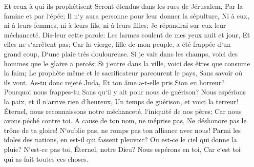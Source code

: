 \verse Et ceux à qui ils prophétisent Seront étendus dans les rues de Jérusalem, Par la famine et par l`épée; Il n`y aura personne pour leur donner la sépulture, Ni à eux, ni à leurs femmes, ni à leurs fils, ni à leurs filles; Je répandrai sur eux leur méchanceté. 
\verse Dis-leur cette parole: Les larmes coulent de mes yeux nuit et jour, Et elles ne s`arrêtent pas; Car la vierge, fille de mon peuple, a été frappée d`un grand coup, D`une plaie très douloureuse. 
\verse Si je vais dans les champs, voici des hommes que le glaive a percés; Si j`entre dans la ville, voici des êtres que consume la faim; Le prophète même et le sacrificateur parcourent le pays, Sans savoir où ils vont. 
\verse As-tu donc rejeté Juda, Et ton âme a-t-elle pris Sion en horreur? Pourquoi nous frappes-tu Sans qu`il y ait pour nous de guérison? Nous espérions la paix, et il n`arrive rien d`heureux, Un temps de guérison, et voici la terreur! 
\verse Éternel, nous reconnaissons notre méchanceté, l`iniquité de nos pères; Car nous avons péché contre toi. 
\verse A cause de ton nom, ne méprise pas, Ne déshonore pas le trône de ta gloire! N`oublie pas, ne romps pas ton alliance avec nous! 
\verse Parmi les idoles des nations, en est-il qui fassent pleuvoir? Ou est-ce le ciel qui donne la pluie? N`est-ce pas toi, Éternel, notre Dieu? Nous espérons en toi, Car c`est toi qui as fait toutes ces choses. 

